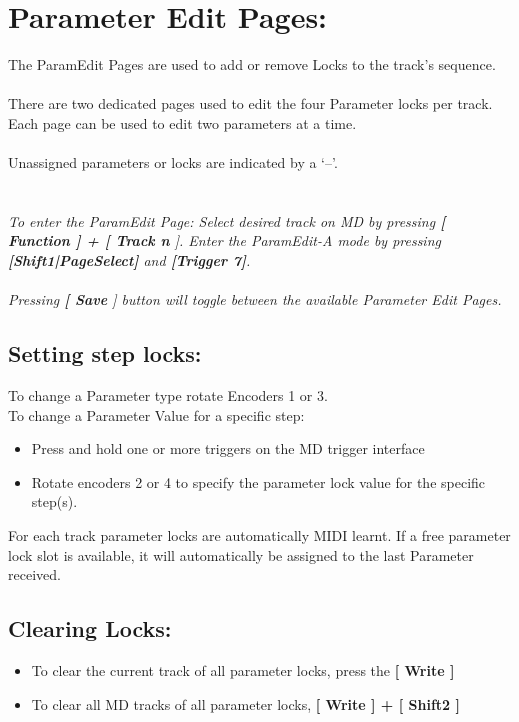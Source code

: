 \chapter{Parameter Edit Pages:}
The ParamEdit Pages are used to add or remove Locks to the track’s sequence.\\
\\
There are two dedicated pages used to edit the four Parameter locks per track.\\
Each page can be used to edit two parameters at a time.\\
\\
Unassigned parameters or locks are indicated by a ‘--’.\\
\\
\\
\textit{To enter the ParamEdit Page: Select desired track on MD by pressing \textbf{[ Function ] + [ Track n }]. Enter the ParamEdit-A mode by pressing \textbf{[Shift1|PageSelect]} and \textbf{[Trigger 7]}.}
\\\\
\textit{Pressing \textbf{[ Save }] button will toggle between the available Parameter Edit Pages.}


\section{Setting step locks:}
To change a Parameter type rotate Encoders 1 or 3.\\
To change a Parameter Value for a specific step:
\begin{itemize}
\item Press and hold one or more triggers on the MD trigger interface
\item Rotate encoders 2 or 4 to specify the parameter lock value for the specific step(s).
\end{itemize}
For each track parameter locks are automatically MIDI learnt. If a free parameter lock slot is available, it will automatically be assigned to the last Parameter received. 
\section{Clearing Locks:}
\begin{itemize}
\item To clear the current track of all parameter locks, press the \textbf{[ Write  ]}
\item To clear all MD tracks of all parameter locks, \textbf{[ Write ] + [ Shift2 ]}
\end{itemize}